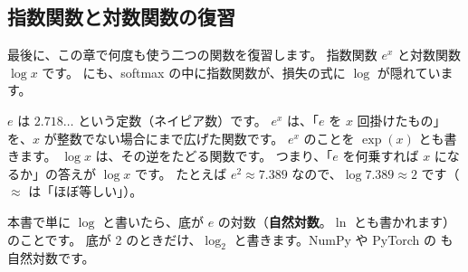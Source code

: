 \subsection*{指数関数と対数関数の復習}

最後に、この章で何度も使う二つの関数を復習します。
指数関数 $e^{x}$ と対数関数 $\log x$ です。
にも、softmax の中に指数関数が、損失の式に $\log$ が隠れています。

$e$ は $2.718\ldots$ という定数（ネイピア数）です。
 $e^{x}$ は、「$e$ を $x$ 回掛けたもの」を、$x$ が整数でない場合にまで広げた関数です。
$e^{x}$ のことを $\exp(x)$ とも書きます。
 $\log x$ は、その逆をたどる関数です。
つまり、「$e$ を何乗すれば $x$ になるか」の答えが $\log x$ です。
たとえば $e^{2}\approx 7.389$ なので、$\log 7.389\approx 2$ です（$\approx$ は「ほぼ等しい」）。

本書で単に $\log$ と書いたら、底が $e$ の対数（\textbf{自然対数}。$\ln$ とも書かれます）のことです。
底が 2 のときだけ、$\log_2$ と書きます。NumPy や PyTorch の  も自然対数です。

